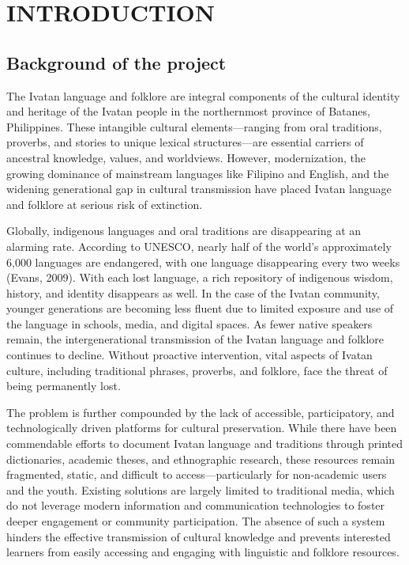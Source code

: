 \section{INTRODUCTION}
    \subsection{Background of the project}
            The Ivatan language and folklore are integral components of the cultural identity and heritage of the Ivatan people in the northernmost province of Batanes, Philippines. These intangible cultural elements—ranging from oral traditions, proverbs, and stories to unique lexical structures—are essential carriers of ancestral knowledge, values, and worldviews. However, modernization, the growing dominance of mainstream languages like Filipino and English, and the widening generational gap in cultural transmission have placed Ivatan language and folklore at serious risk of extinction.

            Globally, indigenous languages and oral traditions are disappearing at an alarming rate. According to UNESCO, nearly half of the world’s approximately 6,000 languages are endangered, with one language disappearing every two weeks (Evans, 2009). With each lost language, a rich repository of indigenous wisdom, history, and identity disappears as well. In the case of the Ivatan community, younger generations are becoming less fluent due to limited exposure and use of the language in schools, media, and digital spaces. As fewer native speakers remain, the intergenerational transmission of the Ivatan language and folklore continues to decline. Without proactive intervention, vital aspects of Ivatan culture, including traditional phrases, proverbs, and folklore, face the threat of being permanently lost.
            
            The problem is further compounded by the lack of accessible, participatory, and technologically driven platforms for cultural preservation. While there have been commendable efforts to document Ivatan language and traditions through printed dictionaries, academic theses, and ethnographic research, these resources remain fragmented, static, and difficult to access—particularly for non-academic users and the youth. Existing solutions are largely limited to traditional media, which do not leverage modern information and communication technologies to foster deeper engagement or community participation. The absence of such a system hinders the effective transmission of cultural knowledge and prevents interested learners from easily accessing and engaging with linguistic and folklore resources.
            
